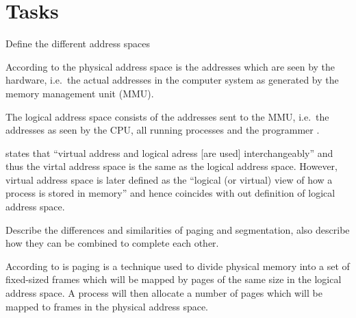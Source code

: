 \documentclass[a4paper]{miunasgn}
\begin{document}
\section{Tasks}
\label{sec:Tasks}
\begin{questions}


	\question\label{q:addressspaces}
	Define the different address spaces
	\begin{solution}
		According to \citet[p. 319]{Silberschatz2009osc} the physical address space 
		is the addresses which are seen by the hardware, i.e.\ the actual addresses 
		in the computer system as generated by the memory management unit (MMU).

		The logical address space consists of the addresses sent to the MMU, i.e.\  
		the addresses as seen by the CPU, all running processes and the programmer 
		\citep[ch. 8]{Silberschatz2009osc}.

		\citet{Silberschatz2009osc} states that ``virtual address and logical 
		adress [are used] interchangeably'' \citep[p. 319]{Silberschatz2009osc} and 
		thus the virtal address space is the same as the logical address space.
		However, virtual address space is later defined as the ``logical (or 
		virtual) view of how a process is stored in memory'' \citep[p.  
		359]{Silberschatz2009osc} and hence coincides with out definition of 
		logical address space.
	\end{solution}

	\question\label{q:segmentpaging}
	Describe the differences and similarities of paging and segmentation,
	also describe how they can be combined to complete each other.
	\begin{solution}
		According to \citet[sec. 8.4.1]{Silberschatz2009osc} is paging is 
		a technique used to divide physical memory into a set of fixed-sized frames 
		which will be mapped by pages of the same size in the logical address 
		space.
		A process will then allocate a number of pages which will be mapped to 
		frames in the physical address space.


\end{solution}
\end{questions}
\end{document}
